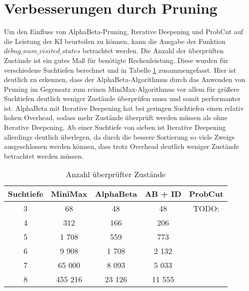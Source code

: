 \section{Verbesserungen durch Pruning}

Um den Einfluss von AlphaBeta-Pruning, Iterative Deepening und ProbCut auf die Leistung der KI beurteilen zu können, kann die Ausgabe der Funktion $debug\_num\_visited\_states$ betrachtet werden.
Die Anzahl der überprüften Zustände ist ein gutes Maß für benötigte Rechenleistung.
Diese wurden für verschiedene Suchtiefen berechnet und in Tabelle \ref{table:numstates} zusammengefasst.
Hier ist deutlich zu erkennen, dass der AlphaBeta-Algorithmus durch das Anwenden von Pruning im Gegensatz zum reinen MiniMax-Algorithmus vor allem für größere Suchtiefen deutlich weniger Zustände überprüfen muss und somit performanter ist.
AlphaBeta mit Iterative Deepening hat bei geringen Suchtiefen einen relativ hohen Overhead, sodass mehr Zustände überprüft werden müssen als ohne Iterative Deepening.
Ab einer Suchtiefe von sieben ist Iterative Deepening allerdings deutlich überlegen, da durch die bessere Sortierung so viele Zweige ausgeschlossen werden können, dass trotz Overhead deutlich weniger Zustände betrachtet werden müssen.

\begin{table}[hb]
\centering
\begin{tabular}{c|cccc}
\hline
Suchtiefe & MiniMax & AlphaBeta & AB + ID & ProbCut \\ \hline
    3     &   68    &    48     &    48   & TODO: \\
    4     &   312   &    166    &    206  & \\
    5     &  1 708  &    559    &    773  & \\
    6     &  9 908  &   1 708   &   2 132 & \\ 
    7     &  65 000 &   8 093   &   5 033 & \\ 
    8     & 455 216 &   23 126  &  11 555 & \\ \hline
\end{tabular}
\caption{Anzahl überprüfter Zustände}
\label{table:numstates}
\end{table}
